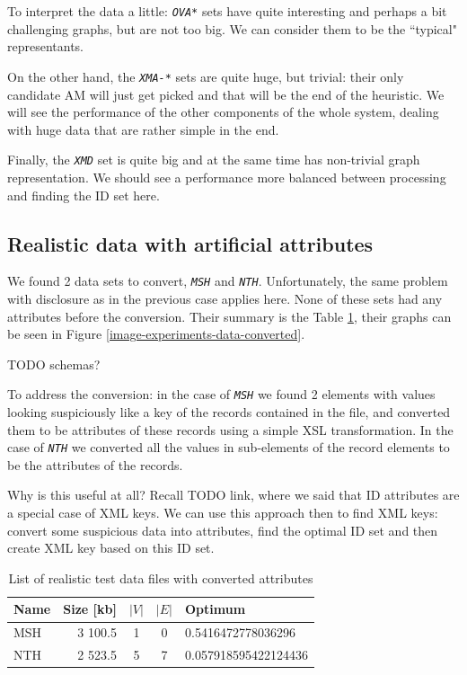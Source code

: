 \documentclass[a4paper,12pt,oneside]{report}
\newcommand{\jmodule}[1]{\texttt{\textit{#1}}}
\theoremstyle{definition}
\begin{document}
To interpret the data a little: \jmodule{OVA*} sets have quite interesting and perhaps a bit challenging graphs, but are not too big. We can consider them to be the ``typical" representants.

On the other hand, the \jmodule{XMA-*} sets are quite huge, but trivial: their only candidate AM will just get picked and that will be the end of the heuristic. We will see the performance of the other components of the whole system, dealing with huge data that are rather simple in the end.

Finally, the \jmodule{XMD} set is quite big and at the same time has non-trivial graph representation. We should see a performance more balanced between processing and finding the ID set here.

\subsection{Realistic data with artificial attributes}
\label{realistic-converted}

We found 2 data sets to convert, \jmodule{MSH} and \jmodule{NTH}. Unfortunately, the same problem with disclosure as in the previous case applies here. None of these sets had any attributes before the conversion. Their summary is the Table \ref{table-experiments-data-converted}, their graphs can be seen in Figure \ref{image-experiments-data-converted}.

TODO schemas?

To address the conversion: in the case of \jmodule{MSH} we found 2 elements with values looking suspiciously like a key of the records contained in the file, and converted them to be attributes of these records using a simple XSL transformation. In the case of \jmodule{NTH} we converted all the values in sub-elements of the record elements to be the attributes of the records.

Why is this useful at all? Recall TODO link, where we said that ID attributes are a special case of XML keys. We can use this approach then to find XML keys: convert some suspicious data into attributes, find the optimal ID set and then create XML key based on this ID set.

\begin{table}
  \caption{List of realistic test data files with converted attributes}
  \bigskip
  \label{table-experiments-data-converted}
  \centering
  \begin{tabular}{l | r | c | c | l}
	Name  & Size [kb] & $|V|$ & $|E|$ & Optimum \\
	\hline
	MSH  & 3 100.5 & 1 & 0 & 0.5416472778036296 \\
	NTH  & 2 523.5 & 5 & 7 & 0.057918595422124436 \\ 
  \end{tabular}
\end{table}
\end{document}
